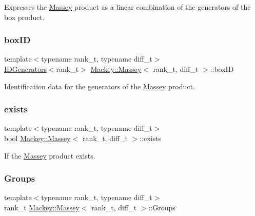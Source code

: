 Expresses the \hyperlink{classMackey_1_1Massey}{Massey} product as a linear combination of the generators of the box product. 

\mbox{\label{classMackey_1_1Massey_ae105b04a17ced9c6fd8fef94a9b56aa2}} 
\subsubsection{\texorpdfstring{box\+ID}{boxID}}
{\footnotesize\ttfamily template$<$typename rank\+\_\+t, typename diff\+\_\+t$>$ \\
\hyperlink{classMackey_1_1IDGenerators}{I\+D\+Generators}$<$rank\+\_\+t$>$ \hyperlink{classMackey_1_1Massey}{Mackey\+::\+Massey}$<$ rank\+\_\+t, diff\+\_\+t $>$\+::box\+ID}



Identification data for the generators of the \hyperlink{classMackey_1_1Massey}{Massey} product. 

\mbox{\label{classMackey_1_1Massey_a7890eb54ac6d6c48576ba131a59e551f}} 
\subsubsection{\texorpdfstring{exists}{exists}}
{\footnotesize\ttfamily template$<$typename rank\+\_\+t, typename diff\+\_\+t$>$ \\
bool \hyperlink{classMackey_1_1Massey}{Mackey\+::\+Massey}$<$ rank\+\_\+t, diff\+\_\+t $>$\+::exists}



If the \hyperlink{classMackey_1_1Massey}{Massey} product exists. 

\mbox{\label{classMackey_1_1Massey_a221c49aa23c7d7cb9a3d26db9e6e4a94}} 
\subsubsection{\texorpdfstring{Groups}{Groups}}
{\footnotesize\ttfamily template$<$typename rank\+\_\+t, typename diff\+\_\+t$>$ \\
rank\+\_\+t \hyperlink{classMackey_1_1Massey}{Mackey\+::\+Massey}$<$ rank\+\_\+t, diff\+\_\+t $>$\+::Groups}



